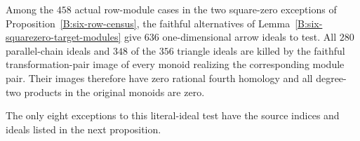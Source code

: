 \begin{lemma}
\label{B:six-squarezero-literal-ideals}
Among the $458$ actual row-module cases in the two square-zero
exceptions of Proposition~\ref{B:six-row-census}, the faithful
alternatives of Lemma~\ref{B:six-squarezero-target-modules}
give $636$ one-dimensional arrow ideals to test.  All $280$
parallel-chain ideals and $348$ of the $356$ triangle ideals
are killed by the faithful transformation-pair image of every
monoid realizing the corresponding module pair.  Their images
therefore have zero rational fourth homology and all degree-two
products in the original monoids are zero.

The only eight exceptions to this literal-ideal test have the
source indices and ideals listed in the next proposition.
\end{lemma}
